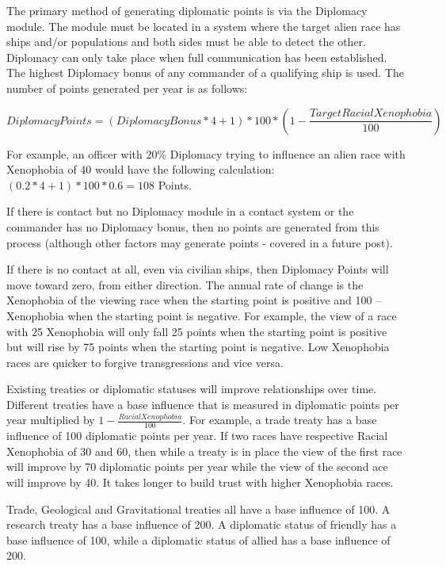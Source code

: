 \documentclass[../Aurora C# unofficial manual.tex]{subfiles}
\begin{document}
	The primary method of generating diplomatic points is via the Diplomacy module. The module must be located in a system where the target alien race has ships and/or populations and both sides must be able to detect the other. Diplomacy can only take place when full communication has been established. The highest Diplomacy bonus of any commander of a qualifying ship is used. The number of points generated per year is as follows:
	
	\[ Diplomacy Points = (Diplomacy Bonus * 4 + 1) * 100 * (1 - \frac{Target Racial Xenophobia}{100}) \]
	
	For example, an officer with 20\% Diplomacy trying to influence an alien race with Xenophobia of 40 would have the following calculation: \( (0.2 * 4 + 1) * 100 * 0.6 = 108 \) Points.
	
	If there is contact but no Diplomacy module in a contact system or the commander has no Diplomacy bonus, then no points are generated from this process (although other factors may generate points - covered in a future post).
	
	If there is no contact at all, even via civilian ships, then Diplomacy Points will move toward zero, from either direction. The annual rate of change is the Xenophobia of the viewing race when the starting point is positive and 100 – Xenophobia when the starting point is negative. For example, the view of a race with 25 Xenophobia will only fall 25 points when the starting point is positive but will rise by 75 points when the starting point is negative. Low Xenophobia races are quicker to forgive transgressions and vice versa.
	
	Existing treaties or diplomatic statuses will improve relationships over time. Different treaties have a base influence that is measured in diplomatic points per year multiplied by \( 1 - \frac{Racial Xenophobia}{100} \). For example, a trade treaty has a base influence of 100 diplomatic points per year. If two races have respective Racial Xenophobia of 30 and 60, then while a treaty is in place the view of the first race will improve by 70 diplomatic points per year while the view of the second ace will improve by 40. It takes longer to build trust with higher Xenophobia races.
	
	Trade, Geological and Gravitational treaties all have a base influence of 100. A research treaty has a base influence of 200. A diplomatic status of friendly has a base influence of 100, while a diplomatic status of allied has a base influence of 200.
	
\end{document}
